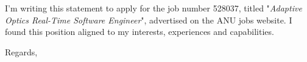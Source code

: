 \documentclass[11pt,a4paper,calibri]{moderncv}
\begin{document}

\date{\today}

\opening{
    I'm writing this statement to apply for the job number 528037, titled "\textit{Adaptive Optics Real-Time Software Engineer}", advertised on the ANU jobs website.
    I found this position aligned to my interests, experiences and capabilities.
}

\closing{Regards,}

\makelettertitle


\end{document}

